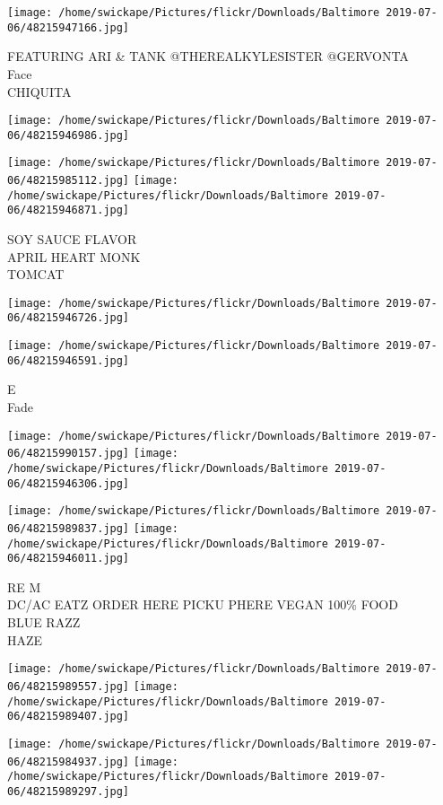 \documentclass[10pt,letterpaper]{article}
\begin{document}
\texttt{[image: /home/swickape/Pictures/flickr/Downloads/Baltimore 2019-07-06/48215947166.jpg]}

FEATURING ARI \& TANK @THEREALKYLESISTER @GERVONTA\\
Face\\
CHIQUITA
\pagebreak

\texttt{[image: /home/swickape/Pictures/flickr/Downloads/Baltimore 2019-07-06/48215946986.jpg]}

\vspace{0.25in}
\texttt{[image: /home/swickape/Pictures/flickr/Downloads/Baltimore 2019-07-06/48215985112.jpg]}
\texttt{[image: /home/swickape/Pictures/flickr/Downloads/Baltimore 2019-07-06/48215946871.jpg]}

SOY SAUCE FLAVOR\\
APRIL HEART MONK\\
TOMCAT
\pagebreak

\texttt{[image: /home/swickape/Pictures/flickr/Downloads/Baltimore 2019-07-06/48215946726.jpg]}

\vspace{0.25in}
\texttt{[image: /home/swickape/Pictures/flickr/Downloads/Baltimore 2019-07-06/48215946591.jpg]}

E\\
Fade
\pagebreak

\texttt{[image: /home/swickape/Pictures/flickr/Downloads/Baltimore 2019-07-06/48215990157.jpg]}
\texttt{[image: /home/swickape/Pictures/flickr/Downloads/Baltimore 2019-07-06/48215946306.jpg]}

\texttt{[image: /home/swickape/Pictures/flickr/Downloads/Baltimore 2019-07-06/48215989837.jpg]}
\texttt{[image: /home/swickape/Pictures/flickr/Downloads/Baltimore 2019-07-06/48215946011.jpg]}

RE M\\
DC/AC EATZ ORDER HERE PICKU PHERE VEGAN 100\% FOOD\\
BLUE RAZZ\\
HAZE
\pagebreak

\texttt{[image: /home/swickape/Pictures/flickr/Downloads/Baltimore 2019-07-06/48215989557.jpg]}
\texttt{[image: /home/swickape/Pictures/flickr/Downloads/Baltimore 2019-07-06/48215989407.jpg]}

\texttt{[image: /home/swickape/Pictures/flickr/Downloads/Baltimore 2019-07-06/48215984937.jpg]}
\texttt{[image: /home/swickape/Pictures/flickr/Downloads/Baltimore 2019-07-06/48215989297.jpg]}
\end{document}
